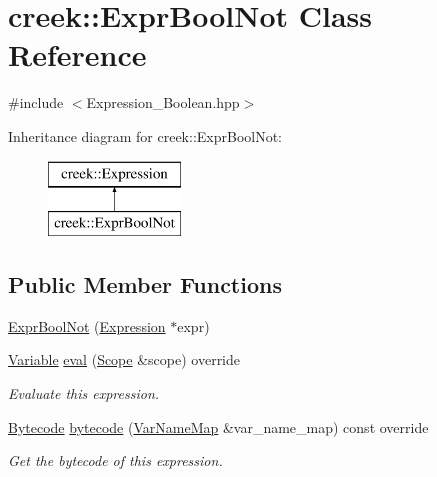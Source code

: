 \hypertarget{classcreek_1_1_expr_bool_not}{}\section{creek\+:\+:Expr\+Bool\+Not Class Reference}
\label{classcreek_1_1_expr_bool_not}


{\ttfamily \#include $<$Expression\+\_\+\+Boolean.\+hpp$>$}

Inheritance diagram for creek\+:\+:Expr\+Bool\+Not\+:\begin{figure}[H]
\begin{center}
\leavevmode
\includegraphics[height=2.000000cm]{classcreek_1_1_expr_bool_not}
\end{center}
\end{figure}
\subsection*{Public Member Functions}
\begin{DoxyCompactItemize}
\item 
\hyperlink{classcreek_1_1_expr_bool_not_a4ef68c59702081fb4eaab84d5ca40ecc}{Expr\+Bool\+Not} (\hyperlink{classcreek_1_1_expression}{Expression} $\ast$expr)
\item 
\hyperlink{classcreek_1_1_variable}{Variable} \hyperlink{classcreek_1_1_expr_bool_not_af7dedd20fe4da94bb9e1c246d45e90cb}{eval} (\hyperlink{classcreek_1_1_scope}{Scope} \&scope) override
\begin{DoxyCompactList}\small\item\em Evaluate this expression. \end{DoxyCompactList}\item 
\hyperlink{classcreek_1_1_bytecode}{Bytecode} \hyperlink{classcreek_1_1_expr_bool_not_a8683ef068a2f1c30f1f66e071c194aa7}{bytecode} (\hyperlink{classcreek_1_1_var_name_map}{Var\+Name\+Map} \&var\+\_\+name\+\_\+map) const  override\hypertarget{classcreek_1_1_expr_bool_not_a8683ef068a2f1c30f1f66e071c194aa7}{}\label{classcreek_1_1_expr_bool_not_a8683ef068a2f1c30f1f66e071c194aa7}

\begin{DoxyCompactList}\small\item\em Get the bytecode of this expression. \end{DoxyCompactList}\end{DoxyCompactItemize}


